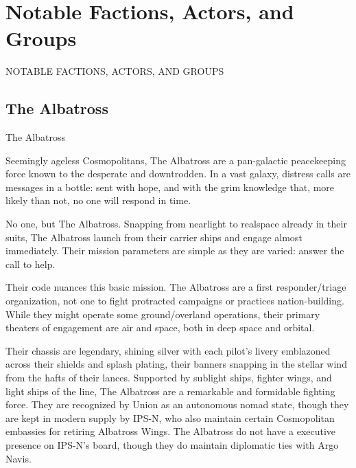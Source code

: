 \section{Notable Factions, Actors, and Groups}


                                                  NOTABLE FACTIONS,
                                                  ACTORS, AND
                                                  GROUPS
\subsection{The Albatross}
                                                  The Albatross

                                                  Seemingly ageless Cosmopolitans, The Albatross
                                                  are a pan-galactic peacekeeping force known to the
                                                  desperate and downtrodden. In a vast galaxy,
                                                  distress calls are messages in a bottle: sent with
                                                  hope, and with the grim knowledge that, more likely
                                                  than not, no one will respond in time.


                                                  No one, but The Albatross. Snapping from nearlight
                                                  to realspace already in their suits, The Albatross
                                                  launch from their carrier ships and engage almost
                                                  immediately. Their mission parameters are simple as
                                                  they are varied: answer the call to help.


                                                  Their code nuances this basic mission. The
                                                  Albatross are a first responder/triage organization,
                                                  not one to fight protracted campaigns or practices
                                                  nation-building. While they might operate some
                                                  ground/overland operations, their primary theaters
                                                  of engagement are air and space, both in deep
                                                  space and orbital.


                                                  Their chassis are legendary, shining silver with each
pilot’s livery emblazoned across their shields and splash plating, their banners snapping in the
stellar wind from the hafts of their lances. Supported by sublight ships, fighter wings, and light
ships of the line, The Albatross are a remarkable and formidable fighting force. They are
recognized by Union as an autonomous nomad state, though they are kept in modern supply by
IPS-N, who also maintain certain Cosmopolitan embassies for retiring Albatross Wings. The
Albatross do not have a executive presence on IPS-N’s board, though they do maintain
diplomatic ties with Argo Navis.


